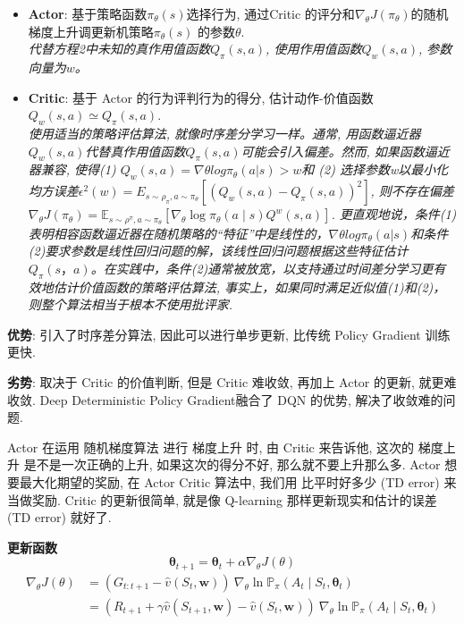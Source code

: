 \documentclass{article}
\begin{document}
        \begin{itemize}
            \item \textbf{Actor}: 基于策略函数$\pi_\theta(s)$选择行为, 通过Critic 的评分和$\nabla_{\theta} J\left(\pi_{\theta}\right)$的随机梯度上升调更新机策略$\pi_\theta(s)$ 的参数$\theta$. \\ \textit{代替方程2中未知的真作用值函数$Q_\pi (s, a)$, 使用作用值函数$Q_w (s, a)$, 参数向量为$w$。}
            
            \item \textbf{Critic}: 基于 Actor 的行为评判行为的得分, 估计动作-价值函数$Q_w (s, a) \simeq  Q_\pi (s, a)$. \\ \textit{使用适当的策略评估算法, 就像时序差分学习一样。通常, 用函数逼近器$Q_w (s, a)$代替真作用值函数$Q_\pi (s, a)$可能会引入偏差。然而, 如果函数逼近器兼容, 使得(1) $Q_w (s, a) = \nabla \theta log \pi_\theta (a | s)>w$和 (2) 选择参数w以最小化均方误差$\epsilon^2 (w)=E_{s \sim \rho_\pi, a \sim \pi_\theta} [ (Q_w (s, a)− Q_\pi (s, a))^2]$, 则不存在偏差$\nabla_{\theta} J\left(\pi_{\theta}\right)=\mathbb{E}_{s \sim \rho^{\pi}, a \sim \pi_{\theta}}\left[\nabla_{\theta} \log \pi_{\theta}(a \mid s) Q^{w}(s, a)\right]$. 更直观地说，条件(1)表明相容函数逼近器在随机策略的“特征”中是线性的，$\nabla \theta log \pi_\theta (a | s)$和条件(2)要求参数是线性回归问题的解，该线性回归问题根据这些特征估计$Q_\pi(s，a)$。在实践中，条件(2)通常被放宽，以支持通过时间差分学习更有效地估计价值函数的策略评估算法, 事实上，如果同时满足近似值(1)和(2)，则整个算法相当于根本不使用批评家. }
        \end{itemize}

        \textbf{优势}: 引入了时序差分算法, 因此可以进行单步更新, 比传统 Policy Gradient 训练更快.
        
        \textbf{劣势}: 取决于 Critic 的价值判断, 但是 Critic 难收敛, 再加上 Actor 的更新, 就更难收敛. Deep Deterministic Policy Gradient融合了 DQN 的优势, 解决了收敛难的问题.  
        
        Actor 在运用 随机梯度算法 进行 梯度上升 时, 由 Critic 来告诉他, 这次的 梯度上升 是不是一次正确的上升, 如果这次的得分不好, 那么就不要上升那么多. Actor 想要最大化期望的奖励, 在 Actor Critic 算法中, 我们用 比平时好多少 (TD error) 来当做奖励. Critic 的更新很简单, 就是像 Q-learning 那样更新现实和估计的误差 (TD error) 就好了.
    
        \textbf{更新函数}
        $$\boldsymbol{\theta}_{t+1} = \boldsymbol{\theta}_{t}+\alpha \nabla_\theta J(\theta)$$
        \begin{align*}
            \nabla_\theta J(\theta)
            &= \left(G_{t: t+1}-\hat{v}\left(S_{t}, \mathbf{w}\right)\right)\  \nabla_\theta \ln \mathbb P_\pi\left(A_{t} \mid S_{t}, \boldsymbol{\theta}_{t}\right) \\
            &= \left(R_{t+1}+\gamma \hat{v}\left(S_{t+1}, \mathbf{w}\right)-\hat{v}\left(S_{t}, \mathbf{w}\right)\right)\ \nabla_\theta \ln \mathbb P_\pi\left(A_{t} \mid S_{t}, \boldsymbol{\theta}_{t}\right) 
        \end{align*}
        
\end{document}
